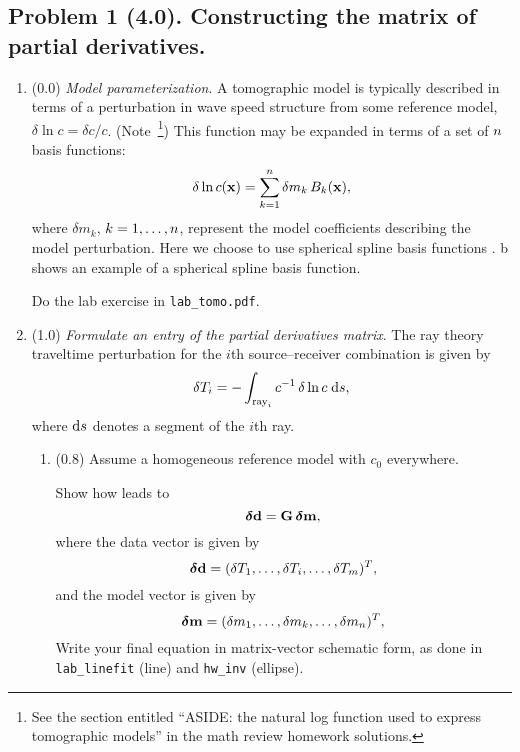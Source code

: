\documentclass[11pt,titlepage,fleqn]{article}
\begin{document}

\subsection*{Problem 1 (4.0). Constructing the matrix of partial derivatives.}

\begin{enumerate}
\item (0.0) {\em Model parameterization}. A tomographic model is typically described in terms of a perturbation in wave speed structure from some reference model, \ie $\delta\ln c = \delta c/c$.
(Note~\footnote{See the section entitled ``ASIDE: the natural log function used to express tomographic models'' in the math review homework solutions.})
This function may be expanded in terms of a set of $n$ basis functions:
%
\begin{equation}
\delta\ln c(\mbox{${\bf x}$})=\sum_{k=1}^n \delta m_k\,B_k(\mbox{${\bf x}$}),
\label{dlnv}
\end{equation}
%
where $\delta m_k$, $k=1,\ldots,n$, represent the model coefficients describing the model perturbation.  Here we choose to use spherical spline basis functions \citep{WangDahlen1995spline,Wang1998}.
b shows an example of a spherical spline basis function.

Do the lab exercise in \verb+lab_tomo.pdf+.


\item (1.0) {\em Formulate an entry of the partial derivatives matrix}.
%
The ray theory traveltime perturbation for the $i$th source--receiver combination is given by
%
\begin{equation}
\delta T_i = -\int_{\mathrm{ray}_i} c^{-1}\,\delta\ln c\;\mathrm{d} s,
\label{ray_tomography}
\end{equation}
%
where $\mathrm{d} s$ denotes a segment of the $i$th ray.

\begin{enumerate}
\item (0.8) Assume a homogeneous reference model with $c_0$ everywhere.

Show how  leads to 
%
\begin{equation}
\mbox{\boldmath $\bf \delta$}\mbox{${\bf d}$} = \mbox{${\bf G}$}\,\mbox{\boldmath $\bf \delta$}\mbox{${\bf m}$},
\end{equation}
%
where the data vector is given by
%
\begin{equation}
\mbox{\boldmath $\bf \delta$}\mbox{${\bf d}$} = (\delta T_1,\ldots,\delta T_i,\ldots,\delta T_m)^T,
\label{d}
\end{equation}
%
and the model vector is given by
%
\begin{equation}
\mbox{\boldmath $\bf \delta$}\mbox{${\bf m}$} = (\delta m_1,\ldots,\delta m_k,\ldots,\delta m_n)^T,
\label{m}
\end{equation}
%
Write your final equation in matrix-vector schematic form, as done in \verb+lab_linefit+ (line) and \verb+hw_inv+ (ellipse).


\end{enumerate}
\end{enumerate}
\end{document}
